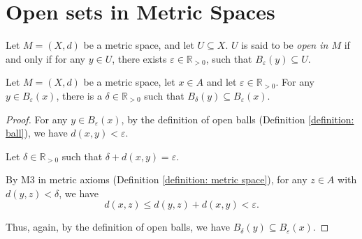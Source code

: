 \section{Open sets in Metric Spaces}


\begin{definition}
	Let $M = (X, d)$ be a metric space, and let $U \subseteq X$. $U$ is said to be \textit{open in $M$} if and only if for any $y \in U$, there exists $\varepsilon \in \mathbb R_{> 0}$, such that $B_\varepsilon(y) \subseteq U$.
\end{definition}


\begin{lemma}
	\label{lemma: open balls of point inside open ball}
	Let $M = (X, d)$ be a metric space, let $x \in A$ and let $\varepsilon \in \mathbb R_{> 0}$. For any $y \in B_\varepsilon (x)$, there is a $\delta \in \mathbb R_{> 0}$ such that $B_\delta (y) \subseteq B_\varepsilon(x)$.
	
	\begin{proof}
		For any $y \in B_\varepsilon (x)$, by the definition of open balls (Definition \ref{definition: ball}), we have $d(x,y) < \varepsilon$.
		
		Let $\delta \in \mathbb R_{> 0}$ such that $\delta + d(x,y) = \varepsilon$.
		
		By M3 in metric axioms (Definition \ref{definition: metric space}), for any $z \in A$ with $d(y,z) < \delta$, we have
		$$
		d(x, z) \le d(y, z) + d(x, y) < \varepsilon.
		$$
		
		Thus, again, by the definition of open balls, we have $B_\delta(y) \subseteq B_\varepsilon(x)$.
	\end{proof}
\end{lemma}


